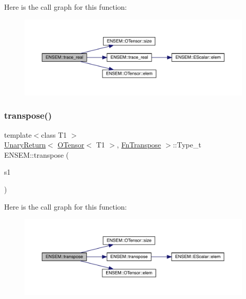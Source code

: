 Here is the call graph for this function\+:\nopagebreak
\begin{figure}[H]
\begin{center}
\leavevmode
\includegraphics[width=350pt]{de/d87/group__obstensor_ga540149a8c9955de22cf6c5562ec69f2f_cgraph}
\end{center}
\end{figure}
\mbox{\label{group__obstensor_gad9570a0a6a341ca0e3c9a3f77fd33c3c}} 
\subsubsection{\texorpdfstring{transpose()}{transpose()}}
{\footnotesize\ttfamily template$<$class T1 $>$ \\
\mbox{\hyperlink{structENSEM_1_1UnaryReturn}{Unary\+Return}}$<$ \mbox{\hyperlink{classENSEM_1_1OTensor}{O\+Tensor}}$<$ T1 $>$, \mbox{\hyperlink{structENSEM_1_1FnTranspose}{Fn\+Transpose}} $>$\+::Type\+\_\+t E\+N\+S\+E\+M\+::transpose (\begin{DoxyParamCaption}\item[{const \mbox{\hyperlink{classENSEM_1_1OTensor}{O\+Tensor}}$<$ T1 $>$ \&}]{s1 }\end{DoxyParamCaption})\hspace{0.3cm}{\ttfamily [inline]}}

Here is the call graph for this function\+:\nopagebreak
\begin{figure}[H]
\begin{center}
\leavevmode
\includegraphics[width=350pt]{de/d87/group__obstensor_gad9570a0a6a341ca0e3c9a3f77fd33c3c_cgraph}
\end{center}
\end{figure}
\mbox{\label{group__obstensor_ga11064bec720719323becc2499a52e251}} 
